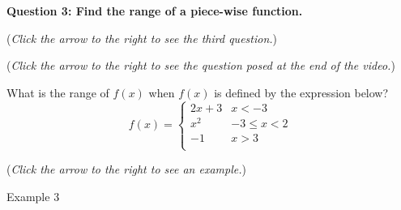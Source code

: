 \documentclass{ximera}
\begin{document}
\textbf{Question 3: Find the range of a piece-wise function.}
\begin{question}
\begin{flushright}
{\color{blue}(\emph{Click the arrow to the right to see the third question.}) }
\end{flushright}
\begin{center}
\begin{expandable}
\begin{flushright}
{\color{blue}(\emph{Click the arrow to the right to see the question
posed at the end of the video.})}
\end{flushright}
\begin{expandable}

What is the range of $f(x)$ when $f(x)$ is defined by the expression below?\\

\[ f(x) = \begin{cases} 
      2x+3 & x<-3 \\
      x^2 & -3\leq x< 2 \\
      -1 & x> 3\\	
   \end{cases} \]
   
\begin{multipleChoice}
\choice{$(\infty, -3] \cup [4,9]$}
\choice{$(\infty, -1] \cup [0,9]$}
\choice{$(\infty, -3) \cup \{-1\} \cup [0,9)$}
\end{multipleChoice}
\begin{flushright}
{\color{blue}(\emph{Click the arrow to the right to see an example.})}
\end{flushright}
\begin{expandable}
Example 3
\end{expandable}
\end{expandable}
\end{expandable}
\end{center}
\end{question}
\end{document}
